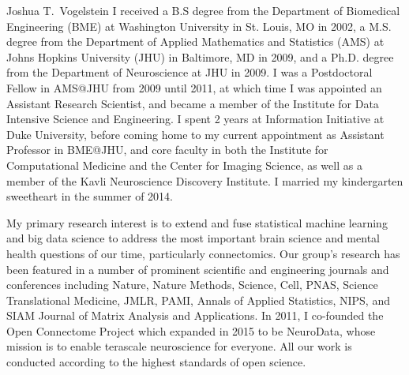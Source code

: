 \documentclass[10pt,journal,compsoc]{IEEEtran}
\begin{document}
\begin{IEEEbiographynophoto}{Joshua T.~Vogelstein}
I received a B.S degree from the Department of Biomedical Engineering (BME) at Washington University in St. Louis, MO in 2002, a M.S. degree from the Department of Applied Mathematics and Statistics (AMS) at Johns Hopkins University (JHU) in Baltimore, MD in 2009, and a Ph.D. degree from the Department of Neuroscience at JHU in 2009. I was a Postdoctoral Fellow in AMS@JHU from 2009 until 2011, at which time I was appointed an Assistant Research Scientist, and became a member of the Institute for Data Intensive Science and Engineering. I spent 2 years at Information Initiative at Duke University, before coming home to my current appointment as Assistant Professor in BME@JHU, and core faculty in both the Institute for Computational Medicine and the Center for Imaging Science, as well as a member of the Kavli Neuroscience Discovery Institute. I married my kindergarten sweetheart in the summer of 2014. 

My primary research interest is to extend and fuse statistical machine learning and big data science to address the most important brain science and mental health questions of our time, particularly  connectomics. Our group’s research has been featured in a number of prominent scientific and engineering journals and conferences including Nature, Nature Methods, Science, Cell, PNAS, Science Translational Medicine, JMLR, PAMI, Annals of Applied Statistics,  NIPS, and SIAM Journal of Matrix Analysis and Applications. In 2011, I co-founded the Open Connectome Project which expanded in 2015 to be NeuroData, whose mission is to enable terascale neuroscience for everyone. All our work is conducted according to the highest standards of open science.
\end{IEEEbiographynophoto}






\end{document}
